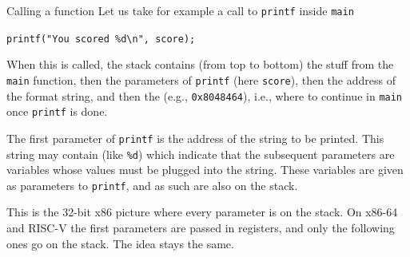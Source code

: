 \begin{parag}{Calling a function}
    Let us take for example a call to \texttt{printf} inside \texttt{main}
    \begin{center}
        \texttt{printf("You scored \%d\textbackslash n", score);}
    \end{center}
    When this is called, the stack contains (from top to bottom) the stuff from the \texttt{main} function, then the parameters of \texttt{printf} (here \texttt{score}), then the address of the format string, and then the  (e.g., \texttt{0x8048464}), i.e., where to continue in \texttt{main} once \texttt{printf} is done.

    The first parameter of \texttt{printf} is the address of the string to be printed. This string may contain  (like \texttt{\%d}) which indicate that the subsequent parameters are variables whose values must be plugged into the string. These variables are given as parameters to \texttt{printf}, and as such are also on the stack.
\end{parag}

\begin{framedremark}
    This is the 32-bit x86 picture where every parameter is on the stack. On x86-64 and RISC-V the first parameters are passed in registers, and only the following ones go on the stack. The idea stays the same.
\end{framedremark}

